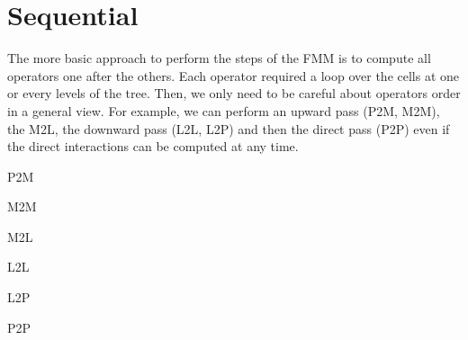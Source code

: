 \documentclass[12pt,letterpaper,titlepage]{report}
\begin{document}
\section{Sequential}
The more basic approach to perform the steps of the FMM is to compute all operators one after the others.
Each operator required a loop over the cells at one or every levels of the tree.
Then, we only need to be careful about operators order in a general view.
For example, we can perform an upward pass (P2M, M2M), the M2L, the downward pass (L2L, L2P) and then the direct pass (P2P) even if the direct interactions can be computed at any time.
\BlankLine
\begin{algorithm}[H]
\linesnumbered
\SetLine
\BlankLine
{}
\BlankLine
\caption{P2M}
\end{algorithm}
\BlankLine
\begin{algorithm}[H]
\linesnumbered
\SetLine
\BlankLine
{}
\BlankLine
\caption{M2M}
\end{algorithm}
\BlankLine
\begin{algorithm}[H]
\linesnumbered
\SetLine
\BlankLine
{}
\BlankLine
\caption{M2L}
\end{algorithm}
\BlankLine
\begin{algorithm}[H]
\linesnumbered
\SetLine
\BlankLine
{}
\BlankLine
\caption{L2L}
\end{algorithm}
\BlankLine
\begin{algorithm}[H]
\linesnumbered
\SetLine
\BlankLine
{}
\BlankLine
\caption{L2P}
\end{algorithm}
\BlankLine
\begin{algorithm}[H]
\linesnumbered
\SetLine
\BlankLine
{}
\BlankLine
\caption{P2P}
\end{algorithm}
\end{document}
